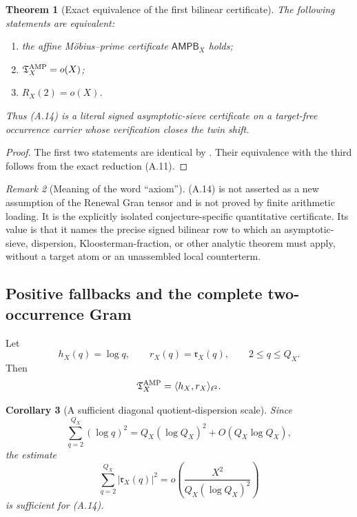 \documentclass[11pt]{article}
\newtheorem{theorem}{Theorem}[section]
\newtheorem{corollary}[theorem]{Corollary}
\theoremstyle{definition}
\theoremstyle{remark}
\newtheorem{remark}[theorem]{Remark}
\begin{document}
\begin{theorem}[Exact equivalence of the first bilinear certificate]
\label{thm:affouter-bilinear-equivalence}
The following statements are equivalent:
\begin{enumerate}[label=\textup{(E\arabic*)},leftmargin=3em]
\item the affine M\"obius--prime certificate $\mathsf{AMPB}_X$ holds;
\item $\mathfrak T_X^{\rm AMP}=o(X)$;
\item $R_X(2)=o(X)$.
\end{enumerate}
Thus \textup{(A.14)} is a literal signed asymptotic-sieve certificate on a
target-free occurrence carrier whose verification closes the twin shift.
\end{theorem}

\begin{proof}
The first two statements are identical by
.
Their equivalence with the third follows from the exact reduction
\textup{(A.11)}.
\end{proof}

\begin{remark}[Meaning of the word ``axiom'']
\textup{(A.14)} is not asserted as a new assumption of the Renewal Gran tensor and is
not proved by finite arithmetic loading.  It is the explicitly isolated
conjecture-specific quantitative certificate.  Its value is that it names the
precise signed bilinear row to which an asymptotic-sieve, dispersion,
Kloosterman-fraction, or other analytic theorem must apply, without a target
atom or an unassembled local counterterm.
\end{remark}

\subsection{Positive fallbacks and the complete two-occurrence Gram}
\label{subsec:affouter-dispersion}

Let
\[
 h_X(q)=\log q,
 \qquad
 r_X(q)=\mathfrak r_X(q),
 \qquad
 2\le q\le Q_X.
\]
Then
\[
 \mathfrak T_X^{\rm AMP}=\langle h_X,r_X\rangle_{\ell^2}.
\]

\begin{corollary}[A sufficient diagonal quotient-dispersion scale]
\label{cor:affouter-L2-sufficient}
Since
\[
 \sum_{q=2}^{Q_X}(\log q)^2
 =Q_X(\log Q_X)^2+O(Q_X\log Q_X),
\]
the estimate
\begin{equation}
 \label{eq:affouter-L2-sufficient}
 \boxed{
 \sum_{q=2}^{Q_X}|\mathfrak r_X(q)|^2
 =o\!\left(
 \frac{X^2}{Q_X(\log Q_X)^2}
 \right)}
 \tag{A.15}
\end{equation}
is sufficient for \textup{(A.14)}.
\end{corollary}
\end{document}

